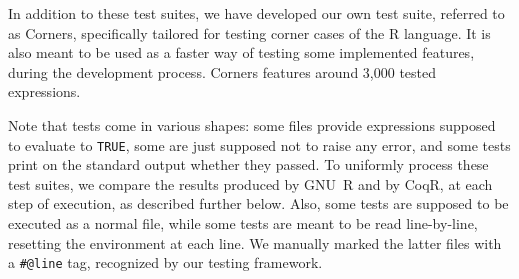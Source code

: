 \documentclass[
    sigplan,
    10pt,
    review, %
    natbib=false %
 ]{acmart}
\newcommand\et[1]{\todo[color=blue!20,size=\scriptsize]{#1}}
\newcommand\td[1]{\todo[color=green!20,size=\scriptsize]{#1}}
\newcommand\CoqR{CoqR}
\begin{document}
In addition to these test suites, we have developed our own test suite, referred to as Corners, specifically tailored for testing corner cases of the R language. It is also meant to be used as a faster way of testing some implemented features, during the development process. Corners features around 3,000 tested expressions.



Note that tests come in various shapes: some files provide expressions supposed to evaluate to \texttt{TRUE}, some are just supposed not to raise any error, and some tests print on the standard output
whether they passed. To uniformly process these test suites,
we compare the results produced by GNU~R and by \CoqR{},
at each step of execution, as described further below.
Also, some tests are supposed to be executed as a normal file, while some tests are meant to be read line-by-line, resetting the environment at each line. We manually marked the latter files with a \texttt{#@line} tag, recognized by our testing framework.\\

\end{document}

